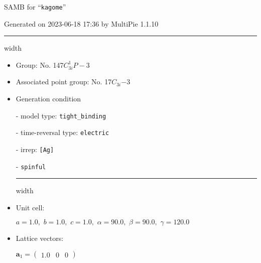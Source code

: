 \documentclass[fleqn,10pt,landscape]{article}
\begin{document}
\setcounter{MaxMatrixCols}{16}

\setlength{\baselineskip}{16pt}
\footnotesize
\begin{center}
\LARGE
SAMB for ``\texttt{kagome}''
\end{center}
\begin{flushright}
Generated on 2023-06-18 17:36 by MultiPie 1.1.10
\end{flushright}
\vspace{1cm}


 \hfil \hrule height 1mm width \textwidth \hfil

\begin{itemize}
\item Group: No. 147\quad$C_{3i}^{1}$\quad$P-3$\quad[ trigonal ]

\item Associated point group: No. 17\quad$C_{3i}$\quad$-3$\quad[ trigonal ]

\vspace{5mm}

\item Generation condition

\quad - model type: \texttt{tight_binding}

\quad - time-reversal type: \texttt{electric}

\quad - irrep: \texttt{[Ag]}

\quad - \texttt{spinful}


 \hfil \hrule height 1mm width \textwidth \hfil

\item Unit cell:

\quad $a=1.0,\,\, b=1.0,\,\, c=1.0,\,\, \alpha=90.0,\,\, \beta=90.0,\,\, \gamma=120.0$

\item Lattice vectors:

\quad $\bm{a}_1=\begin{pmatrix} 1.0 & 0 & 0 \end{pmatrix}$


\end{itemize}
\end{document}
